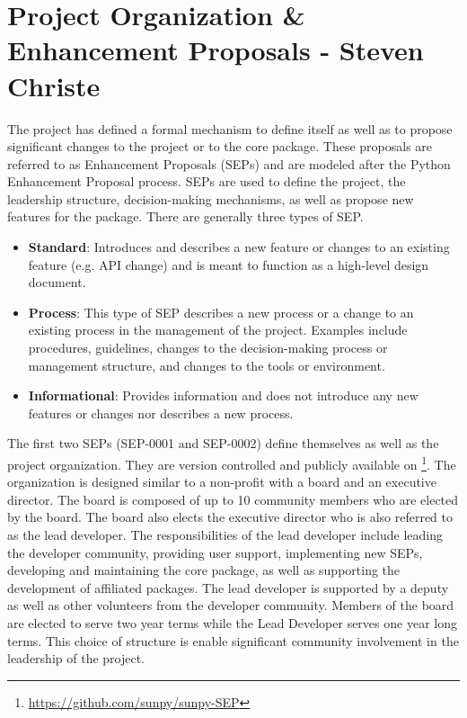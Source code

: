 \section{Project Organization \& Enhancement Proposals - Steven Christe}
The \sunpy project has defined a formal mechanism to define itself as well as to propose significant changes to the project or to the core package. These proposals are referred
to as \sunpy Enhancement Proposals (SEPs) and are modeled after the Python Enhancement Proposal process. SEPs are used to define the project, the leadership structure, decision-making mechanisms, as well as propose new features for the \sunpypkg package. There are generally three types of SEP. 
\begin{itemize}
    \item \textbf{Standard}: Introduces and describes a new feature or changes to an existing feature (e.g. API change) and is meant to function as a high-level design document.
    \item \textbf{Process}: This type of SEP describes a new process or a change to an existing process in the management of the project. Examples include procedures, guidelines, changes to the decision-making process or management structure, and changes to the tools or environment.
    \item \textbf{Informational}: Provides information and does not introduce any new features or changes nor describes a new process.
\end{itemize}
The first two SEPs (SEP-0001 and SEP-0002) define themselves as well as the \sunpy project organization. They are version controlled and publicly available on \github\footnote{\url{https://github.com/sunpy/sunpy-SEP}}. The organization is designed similar to a non-profit with a board and an executive director. The board is composed of up to 10 community members who are elected by the board. The board also elects the executive director who is also referred to as the lead developer. The responsibilities of the lead developer include leading the developer community, providing user support, implementing new SEPs, developing and maintaining the core package, as well as supporting the development of affiliated packages. The lead developer is supported by a deputy as well as other volunteers from the developer community. Members of the board are elected to serve two year terms while the Lead Developer serves one year long terms. This choice of structure is enable significant community involvement in the leadership of the project.


